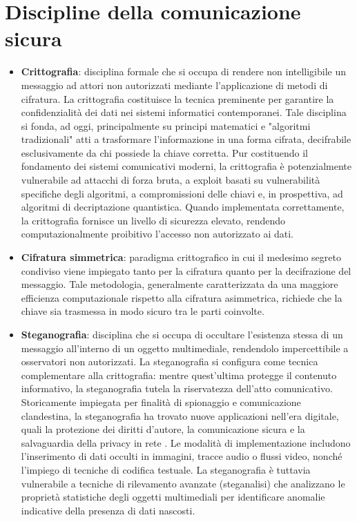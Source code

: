 \section{Discipline della comunicazione sicura}
\begin{itemize}
	\item \textbf{Crittografia}: disciplina formale che si occupa di rendere non intelligibile un messaggio ad attori non autorizzati mediante l'applicazione di metodi di cifratura. La crittografia costituisce la tecnica preminente per garantire la confidenzialità dei dati nei sistemi informatici contemporanei. Tale disciplina si fonda, ad oggi, principalmente su principi matematici e "algoritmi tradizionali" atti a trasformare l'informazione in una forma cifrata, decifrabile esclusivamente da chi possiede la chiave corretta. Pur costituendo il fondamento dei sistemi comunicativi moderni, la crittografia è potenzialmente vulnerabile ad attacchi di forza bruta, a exploit basati su vulnerabilità specifiche degli algoritmi, a compromissioni delle chiavi e, in prospettiva, ad algoritmi di decriptazione quantistica. Quando implementata correttamente, la crittografia fornisce un livello di sicurezza elevato, rendendo computazionalmente proibitivo l'accesso non autorizzato ai dati. \cite{neskey-2025}
	\item \textbf{Cifratura simmetrica}: paradigma crittografico in cui il medesimo segreto condiviso viene impiegato tanto per la cifratura quanto per la decifrazione del messaggio. Tale metodologia, generalmente caratterizzata da una maggiore efficienza computazionale rispetto alla cifratura asimmetrica, richiede che la chiave sia trasmessa in modo sicuro tra le parti coinvolte.
	\item \textbf{Steganografia}: disciplina che si occupa di occultare l'esistenza stessa di un messaggio all'interno di un oggetto multimediale, rendendolo impercettibile a osservatori non autorizzati. La steganografia si configura come tecnica complementare alla crittografia: mentre quest'ultima protegge il contenuto informativo, la steganografia tutela la riservatezza dell'atto comunicativo. Storicamente impiegata per finalità di spionaggio e comunicazione clandestina, la steganografia ha trovato nuove applicazioni nell'era digitale, quali la protezione dei diritti d'autore, la comunicazione sicura e la salvaguardia della privacy in rete \cite{turch-2020}. Le modalità di implementazione includono l'inserimento di dati occulti in immagini, tracce audio o flussi video, nonché l'impiego di tecniche di codifica testuale. La steganografia è tuttavia vulnerabile a tecniche di rilevamento avanzate (steganalisi) che analizzano le proprietà statistiche degli oggetti multimediali per identificare anomalie indicative della presenza di dati nascosti.

\end{itemize}
